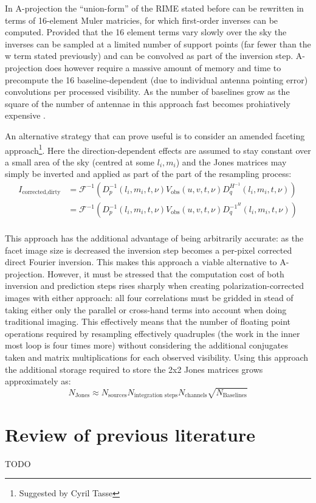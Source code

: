 In A-projection the ``union-form'' of the RIME stated before can be rewritten in terms of 16-element Muler matricies, for which first-order 
inverses can be computed. Provided that the 16 element terms vary slowly over the sky the inverses can be sampled at a limited number
of support points (far fewer than the w term stated previously) and can be convolved as part of the inversion step. A-projection does 
however require a massive amount of memory and time to precompute the 16 baseline-dependent (due to individual antenna pointing error) 
convolutions per processed visibility. As the number of baselines grow as the square of the number of antennae in this approach fast 
becomes prohiatively expensive \cite{tasse2013applying}.

An alternative strategy that can prove useful is to consider an amended faceting approach\footnote{Suggested by Cyril Tasse}. Here the 
direction-dependent effects are assumed to stay constant over a small area of the sky (centred at some $l_i,m_i$) and the Jones 
matrices may simply be inverted and applied as part of the part of the resampling process:
\begin{equation*}
 \begin{split}
 I_{\text{corrected,dirty}} &= \mathcal{F}^{-1}(D_p^{-1}(l_i,m_i,t,\nu)V_{\text{obs}}(u,v,t,\nu)D_q^{H^{-1}}(l_i,m_i,t,\nu))\\
			    &= \mathcal{F}^{-1}(D_p^{-1}(l_i,m_i,t,\nu)V_{\text{obs}}(u,v,t,\nu)D_q^{{-1}^H}(l_i,m_i,t,\nu))\\
 \end{split}
\end{equation*}

This approach has the additional advantage of being arbitrarily accurate: as the facet image size is decreased the inversion step
becomes a per-pixel corrected direct Fourier inversion. This makes this approach a viable alternative to A-projection. However, 
it must be stressed that the computation cost of both inversion and prediction steps rises sharply when creating polarization-corrected 
images with either approach: all four correlations must be gridded in stead of taking either only the parallel or cross-hand terms into 
account when doing traditional imaging. This effectively means that the number of floating point operations required by resampling 
effectively quadruples (the work in the inner most loop is four times more) without considering the additional conjugates taken and 
matrix multiplications for each observed visibility. Using this approach the additional storage required to store the 2x2 Jones 
matrices grows approximately as:
\begin{equation*}
 N_{\text{Jones}} \approx N_{\text{sources}}N_{\text{integration steps}}N_{\text{channels}}\sqrt{N_{\text{Baselines}}}
\end{equation*}

\section{Review of previous literature}
TODO